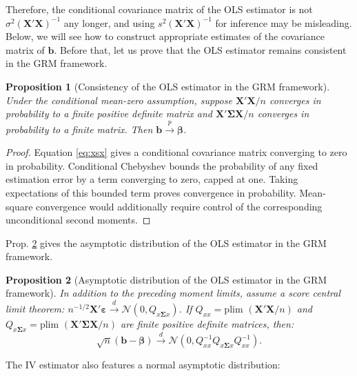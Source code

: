 \documentclass[
  11pt,
]{book}
\newtheorem{proposition}{Proposition}[chapter]
\theoremstyle{definition}
\theoremstyle{definition}
\theoremstyle{definition}
\theoremstyle{definition}
\theoremstyle{remark}
\begin{document}
Therefore, the conditional covariance matrix of the OLS estimator is not \(\sigma^2 (\mathbf{X}'\mathbf{X})^{-1}\) any longer, and using \(s^2 (\mathbf{X}'\mathbf{X})^{-1}\) for inference may be misleading. Below, we will see how to construct appropriate estimates of the covariance matrix of \(\mathbf{b}\). Before that, let us prove that the OLS estimator remains consistent in the GRM framework.

\begin{proposition}[Consistency of the OLS estimator in the GRM framework]
\protect\hypertarget{prp:ols-grm-consistency}{}\label{prp:ols-grm-consistency}Under the conditional mean-zero assumption, suppose \(\mathbf{X}'\mathbf{X}/n\) converges in probability to a finite positive definite matrix and \(\mathbf{X}'\boldsymbol\Sigma\mathbf{X}/n\) converges in probability to a finite matrix. Then \(\mathbf{b}\overset p\longrightarrow\boldsymbol\beta\).
\end{proposition}

\begin{proof}
Equation \eqref{eq:xsx} gives a conditional covariance matrix converging to zero in probability. Conditional Chebyshev bounds the probability of any fixed estimation error by a term converging to zero, capped at one. Taking expectations of this bounded term proves convergence in probability. Mean-square convergence would additionally require control of the corresponding unconditional second moments.
\end{proof}

Prop. \ref{prp:AsymptGRM} gives the asymptotic distribution of the OLS estimator in the GRM framework.

\begin{proposition}[Asymptotic distribution of the OLS estimator in the GRM framework]
\protect\hypertarget{prp:AsymptGRM}{}\label{prp:AsymptGRM}In addition to the preceding moment limits, assume a score central limit theorem: \(n^{-1/2}\mathbf{X}'\boldsymbol\varepsilon\overset d\longrightarrow\mathcal N(0,Q_{x\boldsymbol\Sigma x})\). If \(Q_{xx}=\mbox{plim }(\mathbf{X}'\mathbf{X}/n)\) and \(Q_{x\boldsymbol\Sigma x}=\mbox{plim }(\mathbf{X}'\boldsymbol\Sigma\mathbf{X}/n)\) are finite positive definite matrices, then:
\[
\sqrt{n}(\mathbf{b}-\boldsymbol\beta) \overset{d}{\rightarrow} \mathcal{N}(0,Q_{xx}^{-1}Q_{x\boldsymbol\Sigma x}Q_{xx}^{-1}).
\]
\end{proposition}

The IV estimator also features a normal asymptotic distribution:
\end{document}
